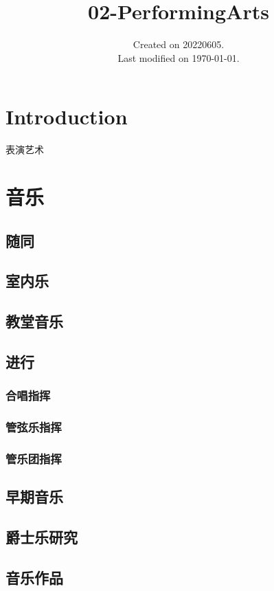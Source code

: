 \documentclass[UTF8]{../RepresentationUniverse}
\begin{document}
\title{02-PerformingArts}
\date{Created on 20220605.\\   Last modified on \today.}
\maketitle
\tableofcontents


\chapter{Introduction}

表演艺术

\chapter{音乐}

\section{随同}
\section{室内乐}
\section{教堂音乐}
\section{进行}
    \subsection{合唱指挥}
    \subsection{管弦乐指挥}
    \subsection{管乐团指挥}
\section{早期音乐}
\section{爵士乐研究}
\section{音乐作品}
\end{document}
